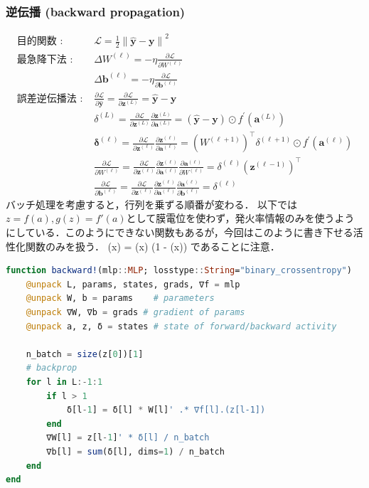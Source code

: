 \subsubsection{逆伝播 (backward propagation)}
\begin{align}
\text{目的関数 : }&\mathcal{L}=\frac{1}{2}\left\|\hat{\mathbf{y}}-\mathbf{y}\right\|^{2}\\
\text{最急降下法 : }&\Delta W^{(\ell)}=-\eta \frac{\partial \mathcal{L}}{\partial W^{(\ell)}}\\
&\Delta \mathbf{b}^{(\ell)}=-\eta \frac{\partial \mathcal{L}}{\partial \mathbf{b}^{(\ell)}}\\
\text{誤差逆伝播法 : }&\frac{\partial \mathcal{L}}{\partial \hat{\mathbf{y}}}=\frac{\partial \mathcal{L}}{\partial \mathbf{z}^{(L)}}=\hat{\mathbf{y}}-\mathbf{y}\\
&\delta^{(L)}=\frac{\partial \mathcal{L}}{\partial \mathbf{z}^{(L)}} \frac{\partial \mathbf{z}^{(L)}}{\partial \mathbf{a}^{(L)}}=\left(\hat{\mathbf{y}}-\mathbf{y}\right) \odot f^{\prime}\left(\mathbf{a}^{(L)}\right)\\
&\mathbf{\delta}^{(\ell)}=\frac{\partial \mathcal{L}}{\partial \mathbf{z}^{(\ell)}} \frac{\partial \mathbf{z}^{(\ell)}}{\partial \mathbf{a}^{(\ell)}}=\left(W^{(\ell+1)}\right)^\top \delta^{(\ell+1)} \odot f^{\prime}\left(\mathbf{a}^{(\ell)}\right)\\
&\frac{\partial \mathcal{L}}{\partial W^{(\ell)}}=\frac{\partial \mathcal{L}}{\partial \mathbf{z}^{(\ell)}} \frac{\partial \mathbf{z}^{(\ell)}}{\partial \mathbf{a}^{(\ell)}} \frac{\partial \mathbf{a}^{(\ell)}}{\partial W^{(\ell)}}=\delta^{(\ell)}\left(\mathbf{z}^{(\ell-1)}\right)^\top\\
&\frac{\partial \mathcal{L}}{\partial \mathbf{b}^{(\ell)}}=\frac{\partial \mathcal{L}}{\partial \mathbf{z}^{(\ell)}} \frac{\partial \mathbf{z}^{(\ell)}}{\partial \mathbf{a}^{(\ell)}} \frac{\partial \mathbf{a}^{(\ell)}}{\partial \mathbf{b}^{(\ell)}}=\delta^{(\ell)}
\end{align}
バッチ処理を考慮すると，行列を乗ずる順番が変わる．
以下では$z=f(a), g(z)=f'(a)$として膜電位を使わず，発火率情報のみを使うようにしている．このようにできない関数もあるが，今回はこのように書き下せる活性化関数のみを扱う．
 (x) = (x) \cdot \left(1 - (x)\right)
であることに注意．
\begin{lstlisting}[language=julia]
function backward!(mlp::MLP; losstype::String="binary_crossentropy")
    @unpack L, params, states, grads, ∇f = mlp
    @unpack W, b = params    # parameters
    @unpack ∇W, ∇b = grads # gradient of params
    @unpack a, z, δ = states # state of forward/backward activity

    n_batch = size(z[0])[1]
    # backprop
    for l in L:-1:1
        if l > 1
            δ[l-1] = δ[l] * W[l]' .* ∇f[l].(z[l-1])
        end
        ∇W[l] = z[l-1]' * δ[l] / n_batch
        ∇b[l] = sum(δ[l], dims=1) / n_batch
    end
end
\end{lstlisting}

